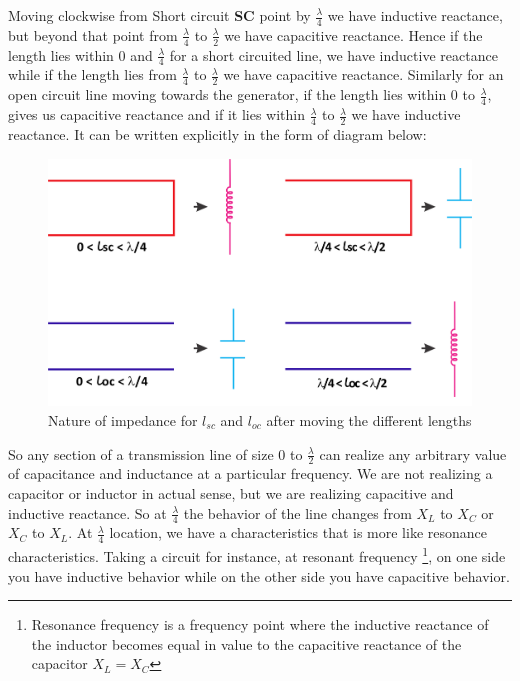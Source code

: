Moving clockwise from Short circuit \textbf{SC} point by $ \frac{\lambda}{4} $ we have inductive reactance, but beyond that point from $ \frac{\lambda}{4} $ to $ \frac{\lambda}{2} $ we have capacitive reactance. Hence if the length lies within 0 and $ \frac{\lambda}{4} $ for a short circuited line, we have inductive reactance while if the length lies from $ \frac{\lambda}{4} $ to $ \frac{\lambda}{2} $ we have capacitive reactance.
Similarly for an open circuit line moving towards the generator, if  the length lies within 0 to $ \frac{\lambda}{4} $, gives us capacitive reactance and if it lies within $ \frac{\lambda}{4} $ to $ \frac{\lambda}{2} $ we have inductive reactance. It can be written explicitly in the form of diagram below:
\begin{figure}[h]
\centering
\includegraphics[width=1\linewidth]{./graphics/group10diagram9}
\caption{Nature of impedance for $ l_{sc} $ and $ l_{oc} $ after moving the different lengths}
\end{figure}

So any section of a transmission line of size 0 to $ \frac{\lambda}{2} $ can realize any arbitrary value of capacitance and inductance at a particular frequency. We are not realizing a capacitor or inductor in actual sense, but we are realizing capacitive and inductive reactance. So at $ \frac{\lambda}{4} $ the behavior of the line changes from $ X_{L} $ to $ X_{C} $ or $ X_{C} $ to $ X_{L} $. At $\frac{\lambda}{4}$  location, we have a characteristics that is more like resonance characteristics. Taking a circuit for instance, at resonant frequency \footnote{Resonance frequency is a frequency point where the inductive reactance of the inductor becomes equal in value to the capacitive reactance of the capacitor \textbf{$ X_{L} = X_{C} $}}, on one side you have inductive behavior while on the other side you have capacitive behavior. 

